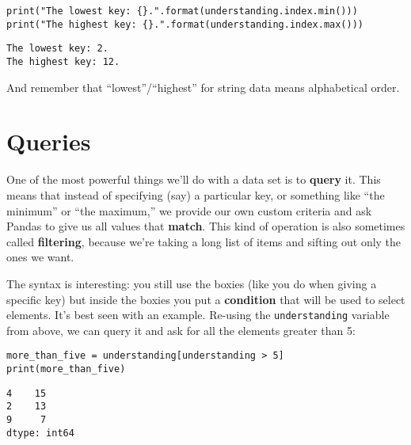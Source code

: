 \begin{Verbatim}[fontsize=\footnotesize,samepage=true,frame=single,framesep=3mm]
print("The lowest key: {}.".format(understanding.index.min()))
print("The highest key: {}.".format(understanding.index.max()))
\end{Verbatim}

\begin{Verbatim}[fontsize=\footnotesize,samepage=true,frame=leftline,framesep=5mm,framerule=1mm]
The lowest key: 2.
The highest key: 12.
\end{Verbatim}

And remember that ``lowest''/``highest'' for string data means alphabetical
order.

\section{Queries}

\label{seriesQueries}

One of the most powerful things we'll do with a data set is to \textbf{query}
it. This means that instead of specifying (say) a particular key, or something
like ``the minimum'' or ``the maximum,'' we provide our own custom criteria and
ask Pandas to give us all values that \textbf{match}. This kind of operation is
also sometimes called \textbf{filtering}, because we're taking a long list of
items and sifting out only the ones we want.



The syntax is interesting: you still use the boxies (like you do when
giving a specific key) but inside the boxies you put a \textbf{condition} that
will be used to select elements. It's best seen with an example. Re-using the
\texttt{understanding} variable from above, we can query it and ask for all the
elements greater than 5:

\begin{Verbatim}[fontsize=\small,samepage=true,frame=single,framesep=3mm]
more_than_five = understanding[understanding > 5]
print(more_than_five)
\end{Verbatim}

\begin{Verbatim}[fontsize=\small,samepage=true,frame=leftline,framesep=5mm,framerule=1mm]
4    15
2    13
9     7
dtype: int64
\end{Verbatim}

